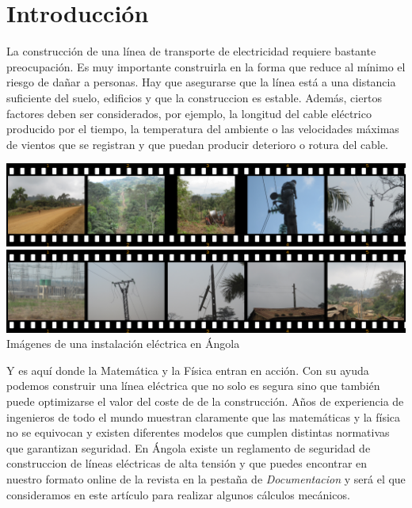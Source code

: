 \section{Introducción}
\label{sec:introduccion}

La construcción de una línea de transporte de electricidad requiere
bastante preocupación. Es muy importante construirla en la forma que
reduce al mínimo el riesgo de dañar a personas. Hay que asegurarse que
la línea está a una distancia suficiente del suelo, edificios y que la
construccion es estable. Además, ciertos factores deben ser
considerados, por ejemplo, la longitud del cable eléctrico producido
por el tiempo, la temperatura del ambiente o las velocidades máximas
de vientos que se registran y que puedan producir deterioro o rotura del
cable.

\begin{figurebox}
  \vspace{20pt}
  \centering
  \includegraphics[scale=0.35]{InstalacionLinea.png}\\
  \includegraphics[scale=0.35]{InstalacionLinea2.png}\\
  Imágenes de una instalación eléctrica en Ángola\\ 
\end{figurebox}

Y es aquí donde la Matemática y la Física entran en acción. Con su
ayuda podemos construir una línea eléctrica que no solo es segura sino
que también puede optimizarse el valor del coste de de la
construcción. Años de experiencia de ingenieros de todo el mundo
muestran claramente que las matemáticas y la física no se equivocan y
existen diferentes modelos que cumplen distintas normativas que
garantizan seguridad.  En Ángola existe un reglamento de seguridad de
construccion de líneas eléctricas de alta tensión y que puedes
encontrar en nuestro formato online de la revista en la pestaña de
\emph{Documentacion} y será el que consideramos en este artículo para
realizar algunos cálculos mecánicos.

